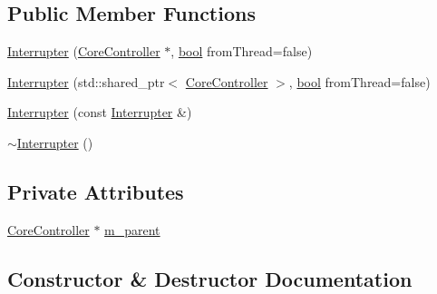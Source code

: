 \subsection*{Public Member Functions}
\begin{DoxyCompactItemize}
\item 
\mbox{\hyperlink{class_q_g_b_a_1_1_core_controller_1_1_interrupter_a0d18068a19626d31acd0f46981389b3b}{Interrupter}} (\mbox{\hyperlink{class_q_g_b_a_1_1_core_controller}{Core\+Controller}} $\ast$, \mbox{\hyperlink{libretro_8h_a4a26dcae73fb7e1528214a068aca317e}{bool}} from\+Thread=false)
\item 
\mbox{\hyperlink{class_q_g_b_a_1_1_core_controller_1_1_interrupter_a049d273dc9f81e8f92f063dab82851e0}{Interrupter}} (std\+::shared\+\_\+ptr$<$ \mbox{\hyperlink{class_q_g_b_a_1_1_core_controller}{Core\+Controller}} $>$, \mbox{\hyperlink{libretro_8h_a4a26dcae73fb7e1528214a068aca317e}{bool}} from\+Thread=false)
\item 
\mbox{\hyperlink{class_q_g_b_a_1_1_core_controller_1_1_interrupter_a8cd26448930b7b618dfb7badcb9568e3}{Interrupter}} (const \mbox{\hyperlink{class_q_g_b_a_1_1_core_controller_1_1_interrupter}{Interrupter}} \&)
\item 
\mbox{\hyperlink{class_q_g_b_a_1_1_core_controller_1_1_interrupter_af5e8fc91095f7390621e98c1b5d91ea5}{$\sim$\+Interrupter}} ()
\end{DoxyCompactItemize}
\subsection*{Private Attributes}
\begin{DoxyCompactItemize}
\item 
\mbox{\hyperlink{class_q_g_b_a_1_1_core_controller}{Core\+Controller}} $\ast$ \mbox{\hyperlink{class_q_g_b_a_1_1_core_controller_1_1_interrupter_a7b246c2cd1a4070ddc602523eb1d1e48}{m\+\_\+parent}}
\end{DoxyCompactItemize}


\subsection{Constructor \& Destructor Documentation}
\mbox{\label{class_q_g_b_a_1_1_core_controller_1_1_interrupter_a0d18068a19626d31acd0f46981389b3b}} 
